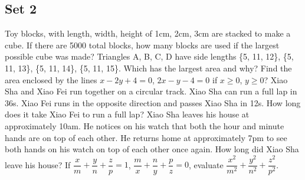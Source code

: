 \documentclass[11pt,a4paper,twoside,UTF8]{exam}
\begin{document}
\subsection*{Set 2}
\begin{questions}
	\question
	Toy blocks, with length, width, height of 1cm, 2cm, 3cm are stacked to make a cube. If there are 5000 total blocks, how many blocks are used if the largest possible cube was made?
	\question
	Triangles A, B, C, D have side lengths \{5, 11, 12\}, \{5, 11, 13\}, \{5, 11, 14\}, \{5, 11, 15\}. Which has the largest area and why?
	\question
	Find the area enclosed by the lines $x - 2y + 4 = 0$, $2x - y - 4 = 0$ if $x \geq 0$, $y \geq 0$?
	\question
	Xiao Sha and Xiao Fei run together on a circular track. Xiao Sha can run a full lap in 36s. Xiao Fei runs in the opposite direction and passes Xiao Sha in 12s. How long does it take Xiao Fei to run a full lap?
	\question
	Xiao Sha leaves his house at approximately 10am. He notices on his watch that both the hour and minute hands are on top of each other. He returns home at approximately 7pm to see both hands on his watch on top of each other once again. How long did Xiao Sha leave his house?
	\setcounter{question}{8}
	\question
	If $\dfrac{x}{m} + \dfrac{y}{n} + \dfrac{z}{p} = 1$, $\dfrac{m}{x} + \dfrac{n}{y} + \dfrac{p}{z} = 0$, evaluate $\dfrac{x^2}{m^2} + \dfrac{y^2}{n^2} + \dfrac{z^2}{p^2}$.
\end{questions}
\end{document}
